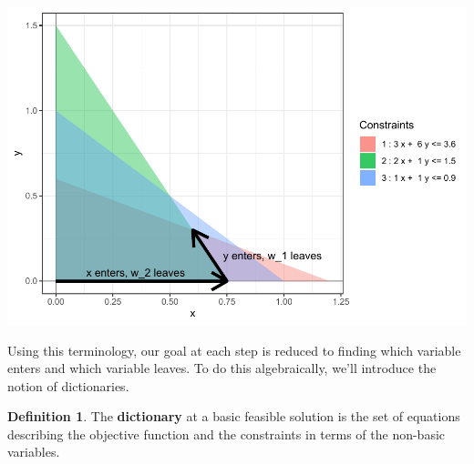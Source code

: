 \documentclass[
]{book}
\theoremstyle{definition}
\newtheorem{definition}{Definition}[chapter]
\theoremstyle{definition}
\theoremstyle{definition}
\theoremstyle{definition}
\theoremstyle{remark}
\begin{document}
\includegraphics{Introduction-to-Optimization_files/figure-latex/fig-bond-portfolio-entering-1.pdf}

Using this terminology, our goal at each step is reduced to finding which variable enters and which variable leaves.
To do this algebraically, we'll introduce the notion of dictionaries.

\begin{definition}
The \textbf{dictionary} at a basic feasible solution is the set of equations describing the objective function and the constraints in terms of the non-basic variables.
\end{definition}
\end{document}
